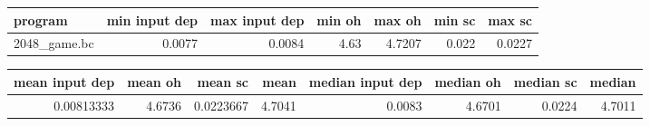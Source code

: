 \begin{tabular}{lrrrrrr}
\hline
 program      &   min input dep &   max input dep &   min oh &   max oh &   min sc &   max sc \\
\hline
 2048\_game.bc &          0.0077 &          0.0084 &     4.63 &   4.7207 &    0.022 &   0.0227 \\
\hline
\end{tabular}

\begin{tabular}{rrrrrrrr}
\hline
   mean input dep &   mean oh &   mean sc &   mean &   median input dep &   median oh &   median sc &   median \\
\hline
       0.00813333 &    4.6736 & 0.0223667 & 4.7041 &             0.0083 &      4.6701 &      0.0224 &   4.7011 \\
\hline
\end{tabular}
